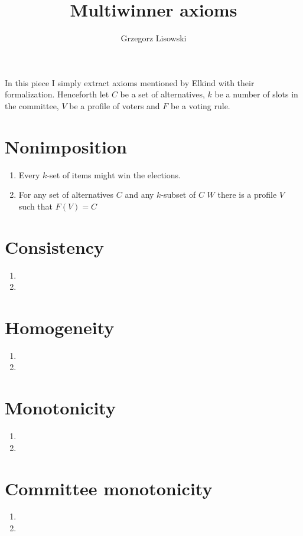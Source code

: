 \documentclass{article}
\title{Multiwinner axioms}
\author{Grzegorz Lisowski}
\begin{document}
\maketitle
In this piece I simply extract axioms mentioned by Elkind with their formalization. Henceforth let $C$ be a set of alternatives, $k$ be a number of slots in the committee, $V$ be a profile of voters and $F$ be a voting rule. 
\section{Nonimposition}
\begin{enumerate}
\item Every $k$-set of items might win the elections.
\item For any set of alternatives $C$ and any $k$-subset of $C$ $W$ there is a profile $V$ such that $F(V)=C$
\end{enumerate}

\section{Consistency}
\begin{enumerate}
\item 
\item 
\end{enumerate}

\section{Homogeneity}
\begin{enumerate}
\item 
\item 
\end{enumerate}

\section{Monotonicity}
\begin{enumerate}
\item 
\item 
\end{enumerate}

\section{Committee monotonicity}
\begin{enumerate}
\item 
\item 
\end{enumerate}
\end{document}
